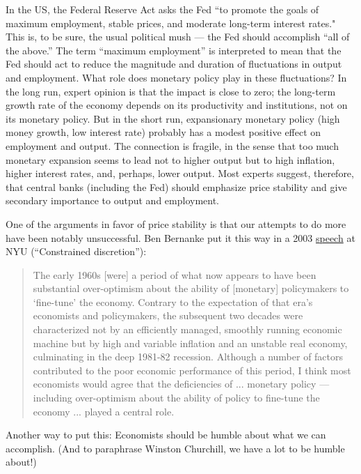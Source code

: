In the US, the Federal Reserve Act asks the Fed ``to promote the
goals of maximum employment, stable prices, and moderate long-term
interest rates."
This is, to be sure, the usual political mush --- the Fed should
accomplish ``all of the above.''
The term ``maximum employment'' is interpreted to mean
that the Fed should act to reduce the magnitude and duration of
fluctuations in output and employment.
What role does monetary policy play in these fluctuations?
In the long run, expert opinion is that the impact is close to zero;
the long-term growth rate of the economy depends on its productivity and institutions,
not on its monetary policy.
But in the short run, expansionary monetary policy
(high money growth, low interest rate)
probably has a modest positive effect on
employment and output.
The connection is fragile, in the sense that too much monetary expansion seems to lead not to higher
output but to high inflation, higher interest rates,
and, perhaps, lower output.
Most experts suggest, therefore,
that central banks  (including the Fed) should emphasize
price stability and give secondary importance to output and
employment.


One of the arguments in favor of price stability is that
our attempts to do more
have been notably unsuccessful.
Ben Bernanke put it this way in a 2003
\href{http://www.federalreserve.gov/boarddocs/Speeches/2003/20030203/default.htm}
{speech} at NYU (``Constrained discretion''):
%
\begin{quote}
The early 1960s [were] a period of what now appears to have been
substantial over-optimism about the ability of [monetary]
policymakers to `fine-tune' the economy. Contrary to the expectation
of that era's economists and policymakers, the subsequent two
decades were characterized not by an efficiently managed, smoothly
running economic machine but by high and variable inflation and an
unstable real economy, culminating in the deep 1981-82 recession.
Although a number of factors contributed to the poor economic
performance of this period, I think most economists would agree that
the deficiencies of ... monetary policy --- including over-optimism
about the ability of policy to fine-tune the economy ... played
a central role.
\end{quote}
%
Another way to put this: Economists should be humble about what we can
accomplish.
(And to paraphrase Winston Churchill, we have a lot to be humble about!)



